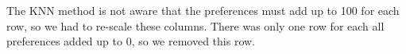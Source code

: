 The KNN method is not aware that the preferences must add up to 100 for each row, so we had to re-scale these columns. There was only one row for each all preferences added up to 0, so we removed this row.

\begin{comment}
We could not apply

We tried 

In our dataset we had 2 variables(tuition and mnsat),which depend on whether they have gone to university or not (indicated in undergrad variable). We realized that all missings fields in mnsat and tuition were caused because the participant hadn't gone to university, becoming an structural missing, which we replaced with 0.\\
After looking at all the rows with missing data, it can be seen that there were three people (iid= 29,59,58), that were responsible for the missing Values, using domain knowledge and expert selection we realized that these people hadn't filled the questionnaires properly(lots of missing values in their rows), that's why we deleted all dates these people had.\\
After that, there were still two types of missing values. Rows with single missing Values and rows with all of them missing. So we cut out rows with all values missing, we concluded that if all attributes values were missing it means that questionnaire was probably not answered, invalidating the row.\\
Finally in all categorical variables with some NA, we created a new level called "Unknown" to encompass all the NA's of the variable, after that, we applied KNN for each numerical variable with some NA in order to replace them with an accurate prediction based on nearest neighbours.
\end{comment}
        
